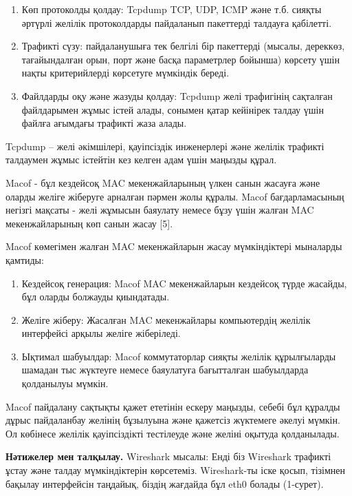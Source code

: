 \begin{enumerate}
\def\labelenumi{\arabic{enumi}.}
\item
  Көп протоколды қолдау: Tcpdump TCP, UDP, ICMP және т.б. сияқты әртүрлі
  желілік протоколдарды пайдаланып пакеттерді талдауға қабілетті.
\item
  Трафикті сүзу: пайдаланушыға тек белгілі бір пакеттерді (мысалы,
  дереккөз, тағайындалған орын, порт және басқа параметрлер бойынша)
  көрсету үшін нақты критерийлерді көрсетуге мүмкіндік береді.
\item
  Файлдарды оқу және жазуды қолдау: Tcpdump желі трафигінің сақталған
  файлдарымен жұмыс істей алады, сонымен қатар кейінірек талдау үшін
  файлға ағымдағы трафикті жаза алады.
\end{enumerate}

Tcpdump -- желі әкімшілері, қауіпсіздік инженерлері және желілік
трафикті талдаумен жұмыс істейтін кез келген адам үшін маңызды құрал.

Macof - бұл кездейсоқ MAC мекенжайларының үлкен санын жасауға және
оларды желіге жіберуге арналған пәрмен жолы құралы. Macof
бағдарламасының негізгі мақсаты - желі жұмысын баяулату немесе бұзу үшін
жалған MAC мекенжайларының көп санын жасау {[}5{]}.

Macof көмегімен жалған MAC мекенжайларын жасау мүмкіндіктері мыналарды
қамтиды:

\begin{enumerate}
\def\labelenumi{\arabic{enumi}.}
\item
  Кездейсоқ генерация: Macof MAC мекенжайларын кездейсоқ түрде жасайды,
  бұл оларды болжауды қиындатады.
\item
  Желіге жіберу: Жасалған MAC мекенжайлары компьютердің желілік
  интерфейсі арқылы желіге жіберіледі.
\item
  Ықтимал шабуылдар: Macof коммутаторлар сияқты желілік құрылғыларды
  шамадан тыс жүктеуге немесе баяулатуға бағытталған шабуылдарда
  қолданылуы мүмкін.
\end{enumerate}

Macof пайдалану сақтықты қажет ететінін ескеру маңызды, себебі бұл
құралды дұрыс пайдаланбау желінің бұзылуына және қажетсіз жүктемеге
әкелуі мүмкін. Ол көбінесе желілік қауіпсіздікті тестілеуде және желіні
оқытуда қолданылады.

\textbf{Нәтижелер мен талқылау.} Wireshark мысалы: Енді біз Wireshark
трафикті ұстау және талдау мүмкіндіктерін көрсетеміз. Wireshark-ты іске
қосып, тізімнен бақылау интерфейсін таңдайық, біздің жағдайда бұл eth0
болады (1-сурет).

